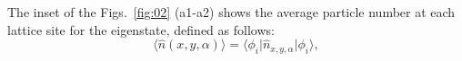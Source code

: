 \documentclass[longbibliography, aps, prx, amsmath, amssymb, amsfonts, twocolumn,superscriptaddress, footinbib]{revtex4-1}
\begin{document}
	The inset of the Figs.~\ref{fig:02} (a1-a2) shows the average particle number at each lattice site for the eigenstate, defined as follows:
	\begin{equation}
		\langle \hat{n}(x,y,\alpha) \rangle = \langle \phi_i \vert \hat{n}_{x,y,\alpha} \vert \phi_i \rangle,
	\end{equation}
\end{document}
